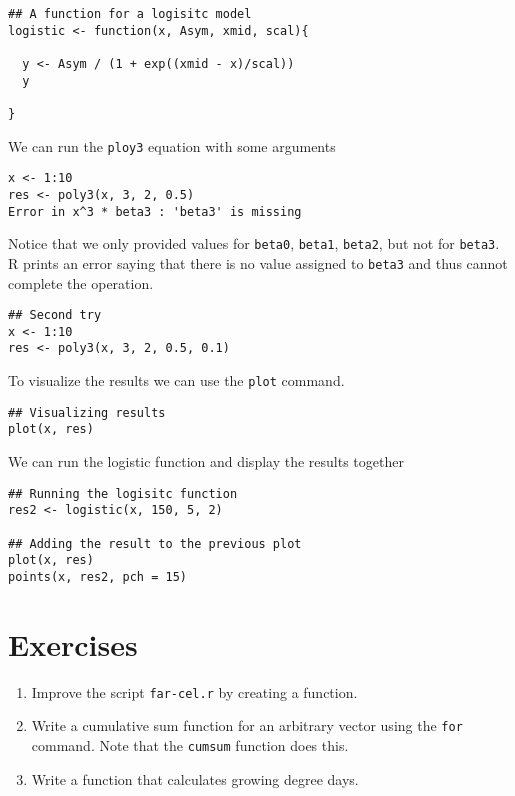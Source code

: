 \begin{lstlisting}
## A function for a logisitc model
logistic <- function(x, Asym, xmid, scal){

  y <- Asym / (1 + exp((xmid - x)/scal))
  y

}
\end{lstlisting}

We can run the \texttt{ploy3} equation with some arguments

\begin{lstlisting}
x <- 1:10
res <- poly3(x, 3, 2, 0.5)
Error in x^3 * beta3 : 'beta3' is missing
\end{lstlisting}

Notice that we only provided values for \texttt{beta0},
\texttt{beta1}, \texttt{beta2}, but not for \texttt{beta3}. R prints
an error saying that there is no value assigned to \texttt{beta3} and
thus cannot complete the operation.

\begin{lstlisting}
## Second try
x <- 1:10
res <- poly3(x, 3, 2, 0.5, 0.1)
\end{lstlisting}

To visualize the results we can use the \texttt{plot} command.

\begin{lstlisting}
## Visualizing results
plot(x, res)
\end{lstlisting}

We can run the logistic function and display the results together

\begin{lstlisting}
## Running the logisitc function
res2 <- logistic(x, 150, 5, 2)

## Adding the result to the previous plot
plot(x, res)
points(x, res2, pch = 15)
\end{lstlisting}

\section{Exercises}

\begin{enumerate}
\item Improve the script \texttt{far-cel.r} by creating a function.
\item Write a cumulative sum function for an arbitrary vector using
  the \texttt{for} command. Note that the \texttt{cumsum} function
  does this.
\item Write a function that calculates growing degree days.

\end{enumerate}